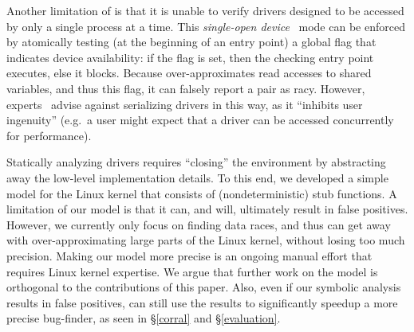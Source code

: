 Another limitation of \whoop is that it is unable to verify drivers designed to be accessed by only a single process at a time. This \emph{single-open device}~\cite[p.\ 173]{corbet2005linux} mode can be enforced by atomically testing (at the beginning of an entry point) a global flag that indicates device availability: if the flag is set, then the checking entry point executes, else it blocks. Because \whoop over-approximates read accesses to shared variables, and thus this flag, it can falsely report a pair as racy. However, experts~\cite[p.\ 173]{corbet2005linux} advise against serializing drivers in this way, as it ``inhibits user ingenuity'' (e.g.\ a user might expect that a driver can be accessed concurrently for performance).

Statically analyzing drivers requires ``closing'' the environment by abstracting away the low-level implementation details. To this end, we developed a simple model for the Linux kernel that consists of (nondeterministic) stub functions. A limitation of our model is that it can, and will, ultimately result in false positives. However, we currently only focus on finding data races, and thus can get away with over-approximating large parts of the Linux kernel, without losing too much precision. Making our model more precise is an ongoing manual effort that requires Linux kernel expertise. We argue that further work on the model is orthogonal to the contributions of this paper. Also, even if our symbolic analysis results in false positives, \whoop can still use the results to significantly speedup a more precise bug-finder, as seen in \S\ref{corral} and \S\ref{evaluation}.
